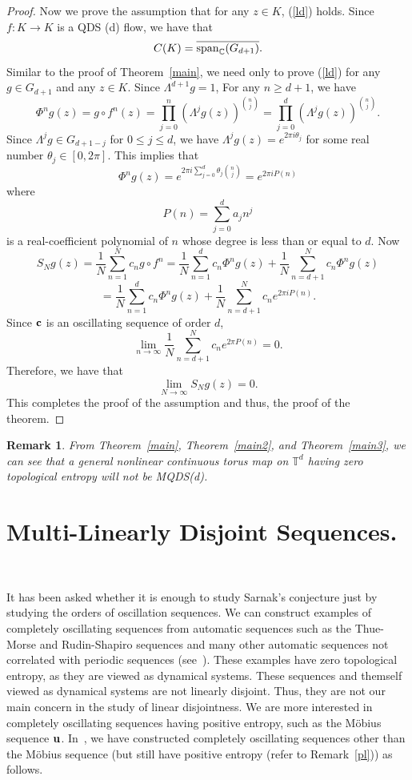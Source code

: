 \documentclass[12pt,letterpaper]{amsart}
\newtheorem{remark}{Remark}
\newcommand {\C} {{\mathbb C}}
\begin{document}
\begin{proof}
Now we prove the assumption that for any $z\in K$, (\ref{ld}) holds. Since $f: K\to K$ is a QDS (d) flow, we have that 
$$
C(K)=\overline{{\rm span}_{\C} (G_{d+1})}.
$$ 
Similar to the proof of Theorem~\ref{main}, we need only to prove (\ref{ld}) for any $g\in G_{d+1}$ and any $z\in K$.
Since $\Lambda^{d+1}g=1$, For any $n\geq d+1$, we have 
$$
\Phi^{n} g(z) =g\circ f^{n}(z) = \prod_{j=0}^{n} (\Lambda^{j}g (z))^{\binom{n}{j}} = \prod_{j=0}^{d} (\Lambda^{j}g (z))^{\binom{n}{j}}.  
$$
Since $\Lambda^{j} g \in G_{d+1-j}$ for $0\leq j \leq d$, we have $\Lambda^{j} g (z)= e^{2\pi i \theta_{j}}$ for some real number $\theta_{j}\in [0, 2\pi]$. This implies that 
$$
\Phi^{n} g(z) = e^{ 2\pi i \sum_{j=0}^{d} \theta_{j} \binom{n}{j}} =e^{2\pi i P (n)}
$$
where 
$$
P (n) =\sum_{j=0}^{d} a_{j} n^{j}
$$ 
is a real-coefficient polynomial of $n$ whose degree is less than or equal to $d$.
Now 
$$
S_{N} g (z) = \frac{1}{N} \sum_{n=1}^{N} c_{n} g\circ f^{n} =  \frac{1}{N} \sum_{n=1}^{d} c_{n} \Phi^{n}g (z) + \frac{1}{N} \sum_{n=d+1}^{N} c_{n} \Phi^{n} g(z) 
$$
$$
= \frac{1}{N} \sum_{n=1}^{d} c_{n} \Phi^{n}g (z) + \frac{1}{N} \sum_{n=d+1}^{N} c_{n} e^{2\pi i P(n)}.
$$
Since ${\bf c}$ is an oscillating sequence of order $d$,
$$
\lim_{n\to \infty} \frac{1}{N} \sum_{n=d+1}^{N} c_{n} e^{2\pi P(n)}=0.
$$
Therefore, we have that 
$$
\lim_{N\to \infty} S_{N} g (z) =0.
$$
This completes the proof of the assumption and thus, the proof of the theorem.
\end{proof}

\medskip
\begin{remark}
From Theorem~\ref{main}, Theorem~\ref{main2}, and Theorem~\ref{main3}, we can see that a general nonlinear continuous torus map on ${\mathbb T}^{d}$ having zero topological entropy will not be MQDS(d). 
\end{remark}  
  
\section{Multi-Linearly Disjoint Sequences.}~\label{cssec}  

It has been asked whether it is enough to study Sarnak's conjecture just by studying the orders of oscillation sequences. We can construct examples of completely oscillating sequences from automatic sequences such as the Thue-Morse and Rudin-Shapiro sequences and many other automatic sequences not correlated with periodic sequences (see~\cite{A1,BKM}). These examples have zero topological entropy, as they are viewed as dynamical systems. These sequences and themself viewed as dynamical systems are not linearly disjoint. Thus, they are not our main concern in the study of linear disjointness. We are more interested in completely oscillating sequences having positive entropy, such as the M\"obius sequence ${\bf u}$. In~\cite{AJ}, we have constructed completely oscillating sequences other than the M\"obius sequence (but still have positive entropy (refer to Remark~\ref{pl})) as follows. 
\end{document}
